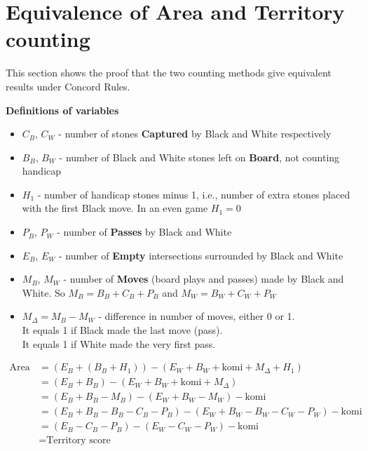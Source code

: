 \documentclass[11pt]{article}
\begin{document}
\newpage
\section*{Equivalence of Area and Territory counting}

This section shows the proof that the two counting methods give equivalent results under Concord Rules.

\textbf{Definitions of variables}

\begin{itemize}
\item $C_B$, $C_W$ - number of stones \textbf{Captured} by Black and White respectively
\item $B_B$, $B_W$ - number of Black and White stones left on \textbf{Board}, not counting handicap
\item $H_1$ - number of handicap stones minus 1, i.e., number of extra stones placed with the first Black move.
In an even game $H_1 = 0$
\item $P_B$, $P_W$ - number of \textbf{Passes} by Black and White
\item $E_B$, $E_W$ - number of \textbf{Empty} intersections surrounded by Black and White
\item $M_B$, $M_W$ - number of \textbf{Moves} (board plays and passes) made by Black and White.
So $M_B = B_B + C_B + P_B$ and $M_W = B_W + C_W + P_W$
\item $M_\Delta = M_B - M_W$ - difference in number of moves, either 0 or 1. \\
It equals 1 if Black made the last move (pass).\\
It equals 1 if White made the very first pass.
\end{itemize}

\begin{align}
\text{Area score} &= (E_B + (B_B+H_1)) - (E_W + B_W + \text{komi} + M_\Delta + H_1) \\
&= (E_B + B_B) - (E_W + B_W + \text{komi} + M_\Delta) \\
&= (E_B + B_B - M_B) - (E_W + B_W - M_W) - \text{komi} \\
&= (E_B + B_B - B_B - C_B - P_B ) - (E_W + B_W - B_W - C_W - P_W) - \text{komi} \\
&= (E_B - C_B - P_B) - (E_W - C_W - P_W) - \text{komi} \\
&= \text{Territory score}
\end{align}
\end{document}
